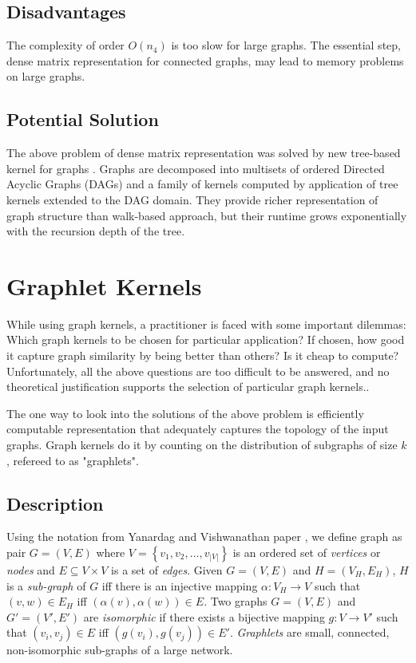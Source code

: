 \subsection{Disadvantages}

The complexity of order $O(n_{4})$  is too slow for large graphs. The essential step, dense matrix representation for connected graphs, may lead to memory problems on large graphs.

\subsection{Potential Solution}

The above problem of dense matrix representation was solved by new tree-based kernel for graphs \citep{Martino2012}. Graphs are decomposed into multisets of ordered Directed Acyclic Graphs (DAGs) and a family of kernels computed by application of tree kernels extended to the DAG domain. They provide richer representation of graph structure than walk-based approach, but their runtime grows exponentially with the recursion depth of the tree.

\section{Graphlet Kernels}
While using graph kernels, a practitioner is faced with some important dilemmas: Which graph kernels to be chosen for particular application?
If chosen, how good it capture graph similarity by being better
than others?  Is it cheap to compute? Unfortunately, all the above questions are too difficult to be answered, and no theoretical justification supports the selection of particular graph kernels.\citep{Yanardag2015B}.

The one way to look into the solutions of the above problem is efficiently computable representation that adequately captures the topology of the input graphs. Graph kernels do it by counting on the distribution of subgraphs of size $k$, refereed to as "graphlets".

\subsection{Description}

Using the notation from Yanardag and Vishwanathan paper \citep{Yanardag2015B}, we define graph as pair $G=(V,E)$ where $V = \left \{ v_1, v_2, \ldots,
  v_{|V|} \right \}$ is an ordered set of \emph{vertices} or
\emph{nodes} and $E \subseteq V \times V$ is a set of \emph{edges}.
Given $G = (V, E)$ and $H = (V_H , E_H )$, $H$ is a {\em sub-graph} of
$G$ iff there is an injective mapping $\alpha : V_H \rightarrow V$ such
that $(v, w) \in E_H$ iff $(\alpha(v), \alpha(w)) \in E$.  Two graphs $G
= (V, E)$ and $G' = (V', E')$ are {\em isomorphic} if there exists a
bijective mapping $g: V \rightarrow V'$ such that $(v_i, v_j) \in E$ iff
$(g(v_i), g(v_j)) \in E'$. {\em Graphlets} are small, connected,
non-isomorphic sub-graphs of a large network.

